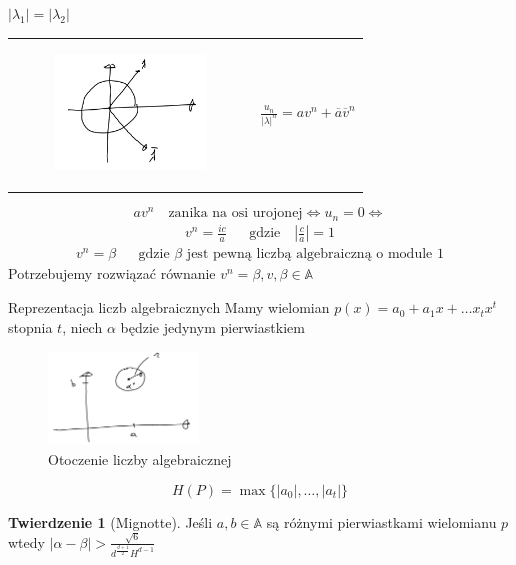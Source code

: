 \documentclass[handout]{beamer}
\def\A{\mathbb{A}}
\theoremstyle{definition}
\newtheorem*{twierdzenie}{Twierdzenie}
\theoremstyle{named}
\begin{document}
\begin{frame}{$|\lambda_1| = |\lambda_2|$}
\begin{table}[]
    \centering
    \begin{tabular}{c c}
       \begin{figure}
            \centering
            \includegraphics[width=40mm]{img/Zaznaczenie_081.png}
        \end{figure}  & 
            $\frac{u_n}{|\lambda|^n} = a v^{n} + \overline{a} \overline{v} ^{n} $
 
    \end{tabular}
\end{table}

\begin{equation*}
    a v^{n} \quad  \text{zanika na osi urojonej} \iff u_n = 0 \iff 
\end{equation*}
\begin{align*}
    v^{n} = \frac{i c}{a} && \text{gdzie} \quad |\frac{c}{a}| = 1
\end{align*}
\begin{align*}
    v^{n} = \beta && \text{gdzie $\beta$ jest pewną liczbą algebraiczną o module 1}
\end{align*}
\pause
Potrzebujemy rozwiązać równanie $v^{n} = \beta, v, \beta \in \A$

\end{frame}

\begin{frame}{Reprezentacja liczb algebraicznych }
    Mamy wielomian $p(x) = a_0 + a_1 x + \ldots x_{t} x^{t}$ stopnia $t$, niech $\alpha$ będzie jedynym pierwiastkiem  
    \begin{figure}
        \centering
        \includegraphics[width=40mm]{img/Zaznaczenie_082.png}
        \caption{Otoczenie liczby algebraicznej}
        \label{fig:my_label}
    \end{figure}
    $$H(P) = \max \{ |a_0|, \ldots, |a_t| \}$$
    \begin{twierdzenie}[Mignotte]
            Jeśli $a,b \in \A$ są różnymi pierwiastkami wielomianu $p$ wtedy 
            $|\alpha - \beta| > \frac{\sqrt{6}}{d^{\frac{d+1}{2}} H^{d-1}}$
    \end{twierdzenie}
    
\end{frame}
\end{document}
